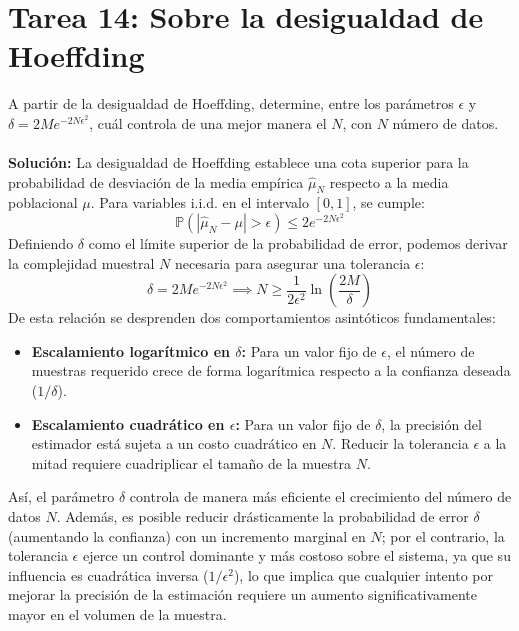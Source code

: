\documentclass{article}
\begin{document}
\section{Tarea 14: Sobre la desigualdad de Hoeffding}
\noindent A partir de la desigualdad de Hoeffding, determine, entre los parámetros $\epsilon$ y $\delta = 2M e^{-2N\epsilon^2}$, cuál controla de una mejor manera el $N$, con $N$ número de datos. \\ \\
\textbf{Solución:}
La desigualdad de Hoeffding establece una cota superior para la probabilidad de desviación de la media empírica $\hat{\mu}_N$ respecto a la media poblacional $\mu$. Para variables i.i.d. en el intervalo $[0,1]$, se cumple:
\[
\mathbb{P}\left( |\hat{\mu}_N - \mu| > \epsilon \right) \leq 2 e^{-2N \epsilon^2}
\]
Definiendo $\delta$ como el límite superior de la probabilidad de error, podemos derivar la complejidad muestral $N$ necesaria para asegurar una tolerancia $\epsilon$:
\[
\delta = 2M e^{-2N \epsilon^2} \implies N \geq \frac{1}{2\epsilon^2} \ln \left( \frac{2M}{\delta} \right)
\]
De esta relación se desprenden dos comportamientos asintóticos fundamentales:
\begin{itemize}
    \item \textbf{Escalamiento logarítmico en $\delta$:} Para un valor fijo de $\epsilon$, el número de muestras requerido crece de forma logarítmica respecto a la confianza deseada ($1/\delta$).
    \item \textbf{Escalamiento cuadrático en $\epsilon$:} Para un valor fijo de $\delta$, la precisión del estimador está sujeta a un costo cuadrático en $N$. Reducir la tolerancia $\epsilon$ a la mitad requiere cuadriplicar el tamaño de la muestra $N$.
\end{itemize}
Así, el parámetro $\delta$ controla de manera más eficiente el crecimiento del número de datos $N$. Además, es posible reducir drásticamente la probabilidad de error $\delta$ (aumentando la confianza) con un incremento marginal en $N$; por el contrario, la tolerancia $\epsilon$ ejerce un control dominante y más costoso sobre el sistema, ya que su influencia es cuadrática inversa ($1/\epsilon^2$), lo que implica que cualquier intento por mejorar la precisión de la estimación requiere un aumento significativamente mayor en el volumen de la muestra.
\end{document}

